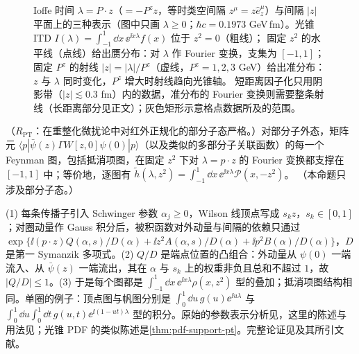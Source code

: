 \begin{figure}[htbp]
\caption{Ioffe 时间 $\lambda=P\cdot z$（$=-P^zz$，等时类空间隔 $z^\mu=z\hat e_z^\mu$）与间隔 $|z|$ 平面上的三种表示（图中只画 $\lambda\ge0$；$\hbar c=0.1973$ GeV\,fm）。光锥 ITD $I(\lambda)=\int_{-1}^1\dd x\,\ee^{\ii x\lambda}f(x)$ 位于 $z^2=0$（粗线）；
固定 $z^2$ 的水平线（点线）给出赝分布：对 $\lambda$ 作 Fourier 变换，支集为 $[-1,1]$；固定 $P^z$ 的射线 $|z|=|\lambda|/P^z$（虚线，$P^z=1,2,3$ GeV）给出准分布：$z$ 与 $\lambda$ 同时变化，$P^z$ 增大时射线趋向光锥轴。
短距离因子化只用阴影带（$|z|\lesssim0.3$ fm）内的数据，准分布的 Fourier 变换则需要整条射线（长距离部分见正文）；灰色矩形示意格点数据所及的范围。}
\label{fig:lamet-ioffe}
\end{figure}
\begin{proposition}\label{prop:lamet-support}
（$R_{\mathrm{PT}}$：在重整化微扰论中对红外正规化的部分子态严格。）对部分子外态，矩阵元 $\langle p|\bar\psi(z)\Gamma W[z,0]\psi(0)|p\rangle$（以及类似的多部分子关联函数）的每一个 Feynman 图，包括抵消项图，在固定 $z^2$ 下对 $\lambda=p\cdot z$ 的 Fourier 变换都支撑在 $[-1,1]$ 中；等价地，逐图有 $\tilde h(\lambda,z^2)=\int_{-1}^1\dd x\,\ee^{\ii x\lambda}\mathcal P(x,-z^2)$。%
（本命题只涉及部分子态。）
\end{proposition}

\begin{proofsketch}
(1) 每条传播子引入 Schwinger 参数 $\alpha_j\ge0$，Wilson 线顶点写成 $s_kz$，$s_k\in[0,1]$；对圈动量作 Gauss 积分后，被积函数对外动量与间隔的依赖只通过 $\exp\{\ii(p\cdot z)Q(\alpha,s)/D(\alpha)+\ii z^2A(\alpha,s)/D(\alpha)+\ii p^2B(\alpha)/D(\alpha)\}$，$D$ 是第一 Symanzik 多项式。(2) $Q/D$ 是端点位置的凸组合：外动量从 $\psi(0)$ 一端流入、从 $\bar\psi(z)$ 一端流出，其在 $\alpha$ 与 $s_k$ 上的权重非负且总和不超过 $1$，故 $|Q/D|\le1$。(3) 于是每个图都是 $\int_{-1}^1\dd x\,\ee^{\ii x\lambda}\rho(x,z^2)$ 型的叠加；抵消项图结构相同。单圈的例子：顶点图与帆图分别是 $\int_0^1\dd u\,g(u)\ee^{\ii u\lambda}$ 与 $\int_0^1\dd u\int_0^1\dd t\,g(u,t)\ee^{\ii(1-ut)\lambda}$ 型的积分\cite[第~III~节]{IzubuchiEtAl2018}。原始的参数表示分析见\cite{Radyushkin:1983wh}，这里的陈述与用法见\cite{Radyushkin2017,Radyushkin:2018cvn,IzubuchiEtAl2018}；光锥 PDF 的类似陈述是\cref{thm:pdf-support-pt}。完整论证见\cite{Radyushkin2017}及其所引文献。
\end{proofsketch}

